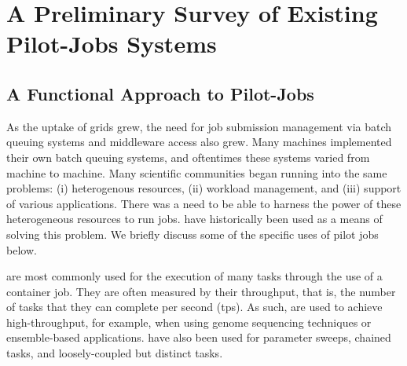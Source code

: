 \documentclass{sig-alternate}
\begin{document}

\section{A Preliminary Survey of Existing Pilot-Jobs Systems}
\label{sec:survey}


\subsection{A Functional Approach to Pilot-Jobs}

As the uptake of grids grew, the need for job submission management
via batch queuing systems and middleware access also grew. Many
machines implemented their own batch queuing systems, and oftentimes
these systems varied from machine to machine. Many scientific
communities began running into the same problems: (i) heterogenous
resources, (ii) workload management, and (iii) support of various
applications. There was a need to be able to
harness the power of these heterogeneous resources to run
jobs. \pilotjobs have historically been used as a means of solving
this problem. We briefly discuss some of the specific uses of pilot 
jobs below.

\pilotjobs are most commonly used for the execution of many tasks
through the use of a container job. They are often measured by
their throughput, that is, the number of tasks that they can complete
per second (tps). As such, \pilotjobs are used to achieve
high-throughput, for example, when using genome sequencing techniques
or ensemble-based applications. \pilotjobs have also been used for
parameter sweeps, chained tasks, and loosely-coupled but distinct
tasks. %
\end{document}
